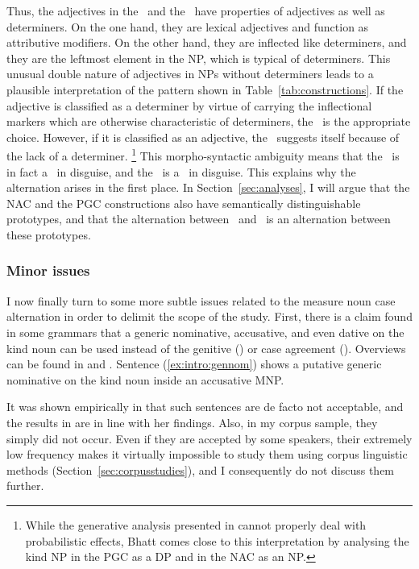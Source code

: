 Thus, the adjectives in the \NACa\ and the \PGCa\ have properties of adjectives as well as determiners.
On the one hand, they are lexical adjectives and function as attributive modifiers.
On the other hand, they are inflected like determiners, and they are the leftmost element in the NP, which is typical of determiners.
This unusual double nature of adjectives in NPs without determiners leads to a plausible interpretation of the pattern shown in Table~\ref{tab:constructions}.
If the adjective is classified as a determiner by virtue of carrying the inflectional markers which are otherwise characteristic of determiners, the \PGCa\ is the appropriate choice.
However, if it is classified as an adjective, the \NACa\ suggests itself because of the lack of a determiner.%
\footnote{While the generative analysis presented in \cite{Bhatt1990} cannot properly deal with probabilistic effects, Bhatt comes close to this interpretation by analysing the kind NP in the PGC as a DP and in the NAC as an NP.}
This morpho-syntactic ambiguity means that the \NACa\ is in fact a \NACb\ in disguise, and the \PGCa\ is a \PGCd\ in disguise.
This explains why the alternation arises in the first place.
In Section~\ref{sec:analyses}, I will argue that the NAC and the PGC constructions also have semantically distinguishable prototypes, and that the alternation between \PGCa\ and \NACa\ is an alternation between these prototypes.

\subsubsection{Minor issues}
\label{sec:neighbouringcases}

I now finally turn to some more subtle issues related to the measure noun case alternation in order to delimit the scope of the study.
First, there is a claim found in some grammars that a generic nominative, accusative, and even dative on the kind noun can be used instead of the genitive (\PGCa) or case agreement (\NACa).
Overviews can be found in \cite{Hentschel1993} and \cite{Zimmer2015}.
Sentence (\ref{ex:intro:gennom}) shows a putative generic nominative on the kind noun inside an accusative MNP.

\begin{exe}
\end{exe}

It was shown empirically in \cite{Hentschel1993} that such sentences are de facto not acceptable, and the results in \citet{Zimmer2015} are in line with her findings.
Also, in my corpus sample, they simply did not occur.
Even if they are accepted by some speakers, their extremely low frequency makes it virtually impossible to study them using corpus linguistic methods (Section~\ref{sec:corpusstudies}), and I consequently do not discuss them further.

